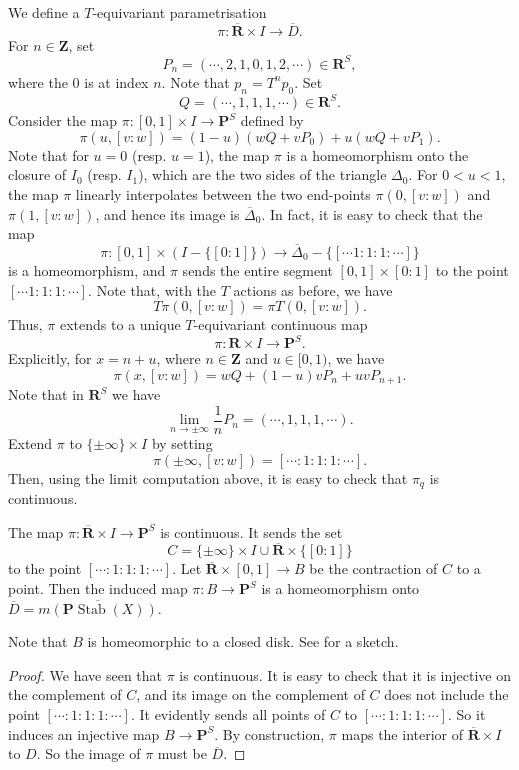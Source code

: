 \documentclass{amsart}
\begin{document}
We define a \(T\)-equivariant parametrisation
\[ \pi \colon \overline{\mathbf{R}} \times I \to \overline D.\]
For \(n \in \mathbf{Z}\), set
\[ P_n = (\cdots , 2 , 1,  0 , 1 , 2 , \cdots) \in \mathbf{R}^S,\]
where the \(0\) is at index \(n\).
Note that \(p_n = T^np_0\).
Set
\[ Q = (\cdots , 1, 1, 1, \cdots ) \in \mathbf{R}^S.\]
Consider the map \(\pi \colon [0,1] \times I \to \mathbf{P}^S\) defined by
\[ \pi(u,[v:w]) = (1-u)(wQ + vP_0) + u (wQ + vP_1).\]
Note that for  \(u = 0\) (resp. \(u = 1\)), the map \(\pi\) is a homeomorphism onto the closure of \(I_0\) (resp. \(I_1\)), which are the two sides of the triangle \(\Delta_0\).
For \(0 < u < 1\), the map \(\pi\) linearly interpolates between the two end-points \(\pi(0,[v:w])\) and \(\pi(1,[v:w])\), and hence its image is \(\overline \Delta_0\).
In fact, it is easy to check that the map
\[ \pi \colon [0,1] \times \left(I - \{[0:1]\}\right) \to \overline \Delta_0 - \{[\cdots 1 : 1: 1: \cdots]\}\]
is a homeomorphism, and \(\pi\) sends the entire segment \([0,1] \times [0:1]\) to the point \([\cdots 1 : 1: 1: \cdots]\).
Note that, with the \(T\) actions as before, we have
\[ T \pi(0,[v:w]) = \pi T(0,[v:w]).\]
Thus, \(\pi\) extends to a unique \(T\)-equivariant continuous map
\[ \pi \colon \mathbf{R} \times I \to \mathbf{P}^S.\]
Explicitly, for \(x = n + u\), where \(n \in \mathbf{Z}\) and \(u \in [0,1)\), we have
\[ \pi(x,[v:w]) = w Q + (1-u) v P_n + uvP_{n+1}.\]
Note that in \(\mathbf{R}^S\) we have
\[ \lim_{n \to \pm\infty} \frac{1}{n}P_n = (\cdots, 1, 1, 1, \cdots).\]
Extend \(\pi\) to \(\{\pm \infty\} \times I\) by setting
\[ \pi(\pm \infty, [v:w]) = [\cdots : 1 : 1 : 1 : \cdots].\]
Then, using the limit computation above, it is easy to check that \(\pi_q\) is continuous.
\begin{theorem}\label{prop:pi}
  The map \(\pi \colon \overline{\mathbf{R}} \times I \to \mathbf{P}^S\) is continuous.
  It sends the set \[C = \{\pm \infty\} \times I \cup \overline{\mathbf{R}} \times \{[0:1]\}\]
  to the point \([\cdots: 1: 1: 1: \cdots]\).
  Let \(\overline{\mathbf{R}} \times [0,1] \to B\) be the contraction of \(C\) to a point.
  Then the induced map \(\pi \colon B \to \mathbf{P}^S\) is a homeomorphism onto \(\overline D = \overline{m(\mathbf{P}\operatorname{Stab}(X))}\).
\end{theorem}
Note that \(B\) is homeomorphic to a closed disk.
See  for a sketch.
\begin{proof}
  We have seen that \(\pi\) is continuous.
  It is easy to check that it is injective on the complement of \(C\), and its image on the complement of \(C\) does not include the point \([\cdots: 1:1:1: \cdots]\).
  It evidently sends all points of \(C\) to \([\cdots: 1:1:1: \cdots]\).
  So it induces an injective map \(B \to \mathbf{P}^S\).
  By construction, \(\pi\) maps the interior of \(\overline{\mathbf{R}} \times I\) to \(D\).
  So the image of \(\pi\) must be \(\overline D\).
\end{proof}
\end{document}
